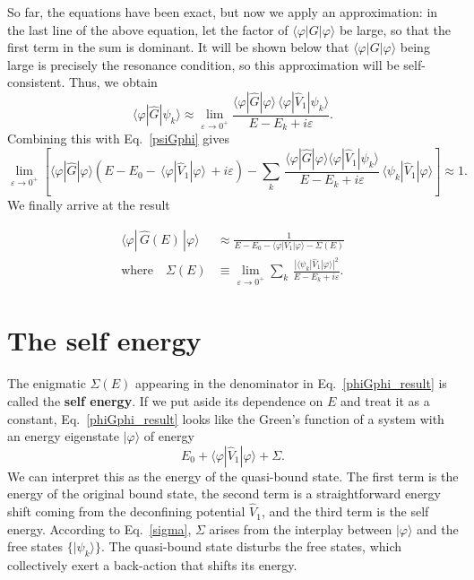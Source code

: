 \documentclass[prx,12pt]{revtex4-2}
\begin{document}
So far, the equations have been exact, but now we apply an
approximation: in the last line of the above equation, let the factor
of $\langle\varphi|G|\varphi\rangle$ be large, so that the first term
in the sum is dominant.  It will be shown below that
$\langle\varphi|G|\varphi\rangle$ being large is precisely the
resonance condition, so this approximation will be self-consistent.
Thus, we obtain
\begin{equation}
  \langle\varphi|\hat{G}|\psi_k\rangle \approx \lim_{\varepsilon\rightarrow0^+} \frac{\langle\varphi|\hat{G}|\varphi\rangle \, \langle\varphi|\hat{V}_1|\psi_k\rangle}{E-E_k+i\varepsilon}.
  \label{phiGpsi}
\end{equation}
Combining this with Eq.~\eqref{psiGphi} gives
\begin{equation*}
  \lim_{\varepsilon\rightarrow0^+} \left[\langle\varphi|\hat{G}|\varphi\rangle \left(E - E_0 -\, \langle\varphi|\hat{V}_1|\varphi\rangle \, + i\varepsilon\right) - \sum_k\, \frac{\langle\varphi|\hat{G}|\varphi\rangle\langle\varphi|\hat{V}_1|\psi_k\rangle}{E-E_k+i\varepsilon} \, \langle\psi_k| \hat{V}_1|\varphi\rangle\right] \approx 1.
\end{equation*}
We finally arrive at the result
\begin{framed}
  \begin{align}
    \langle\varphi|\,\hat{G}(E)\,|\varphi\rangle
    &\approx \frac{1}{\displaystyle E - E_0 - \langle\varphi|V_1|\varphi\rangle - \Sigma(E)}
    \label{phiGphi_result} \\
    \mathrm{where}\quad
    \Sigma(E) &\equiv \lim_{\varepsilon\rightarrow0^+}
    \sum_k \, \frac{\displaystyle| \langle\psi_k| \hat{V}_1|\varphi\rangle|^2}{\displaystyle E-E_k+i\varepsilon}.
    \label{sigma}
  \end{align}
\end{framed}

\section{The self energy}
\label{sec:self_energy}

The enigmatic $\Sigma(E)$ appearing in the denominator in
Eq.~\eqref{phiGphi_result} is called the \textbf{self energy}.  If we
put aside its dependence on $E$ and treat it as a constant,
Eq.~\eqref{phiGphi_result} looks like the Green's function of a system
with an energy eigenstate $|\varphi\rangle$ of energy
\begin{equation*}
  E_0 + \langle\varphi|\hat{V}_1|\varphi\rangle + \Sigma.
\end{equation*}
We can interpret this as the energy of the quasi-bound state.  The
first term is the energy of the original bound state, the second term
is a straightforward energy shift coming from the deconfining
potential $\hat{V}_1$, and the third term is the self energy.
According to Eq.~\eqref{sigma}, $\Sigma$ arises from the interplay
between $|\varphi\rangle$ and the free states $\{|\psi_k\rangle\}$.
The quasi-bound state disturbs the free states, which collectively
exert a back-action that shifts its energy.
\end{document}
